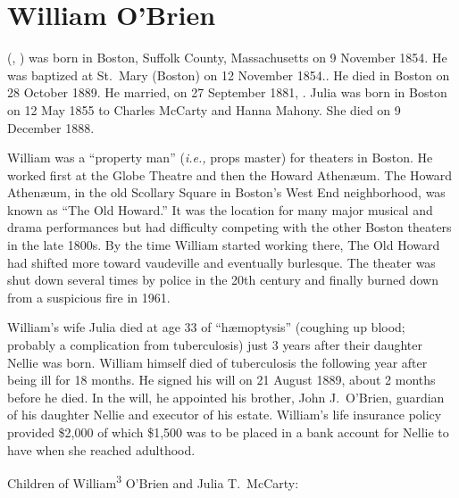 \section{William O'Brien}

 (, ) was born in Boston, Suffolk County, Massachusetts on 9 November 1854.\cite{William3OBrienBirth} He was baptized at St.\ Mary (Boston) on 12 November 1854.\cite{William3OBrienBaptism}. He died in Boston on 28 October 1889.\cite{William3OBrienDeath} He married, on 27 September 1881, . Julia was born in Boston on 12 May 1855 to Charles McCarty and Hanna Mahony.\cite{JuliaMcCartyBaptism} She died on 9 December 1888.\cite{JuliaMcCartyDeath}

William was a ``property man'' (\textit{i.e.,} props master\cite{PropertyMan}) for theaters in Boston. He worked first at the Globe Theatre\cite{WilliamOBrien1880} and then the Howard Athen\ae um.\cite{WilliamOBrien1883} The Howard Athen\ae um, in the old Scollary Square in Boston's West End neighborhood, was known as ``The Old Howard.'' It was the location for many major musical and drama performances but had difficulty competing with the other Boston theaters in the late 1800s. By the time William started working there, The Old Howard had shifted more toward vaudeville and eventually burlesque. The theater was shut down several times by police in the 20th century and finally burned down from a suspicious fire in 1961.\cite{HowardAthenaeum}

William's wife Julia died at age 33 of ``h\ae moptysis'' (coughing up blood; probably a complication from tuberculosis) just 3 years after their daughter Nellie was born.\cite{JuliaMcCartyDeath} William himself died of tuberculosis the following year after being ill for 18 months.\cite{William3OBrienDeath} He signed his will on 21 August 1889, about 2 months before he died. In the will, he appointed his brother, John J.\ O'Brien, guardian of his daughter Nellie and executor of his estate. William's life insurance policy provided \$2,000 of which \$1,500 was to be placed in a bank account for Nellie to have when she reached adulthood.\cite{WilliamOBrienWill}

\begin{KidsIntro}
	Children of William\textsuperscript{3} O'Brien and Julia T.\ McCarty:
\end{KidsIntro}

